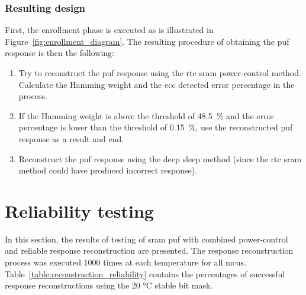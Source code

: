 \subsubsection*{Resulting design}

First, the enrollment phase is executed as is illustrated in Figure~\ref{fig:enrollment_diagram}. The resulting procedure of obtaining the \gls{puf} response is then the following:
\begin{enumerate}
    \item Try to reconstruct the \gls{puf} response using the \gls{rtc} \gls{sram} power-control method. Calculate the Hamming weight and the \gls{ecc} detected error percentage in the process.
    \item If the Hamming weight is above the threshold of 48.5~\% and the error percentage is lower than the threshold of 0.15~\%, use the reconstructed \gls{puf} response as a result and end.
    \item Reconstruct the \gls{puf} response using the deep sleep method (since the \gls{rtc} \gls{sram} method could have produced incorrect response).
\end{enumerate}

\section{Reliability testing}\label{sec:testing}

In this section, the results of testing of \gls{sram} \gls{puf} with combined power-control and reliable response reconstruction are presented. The response reconstruction process was executed 1000 times at each temperature for all \glspl{mcu}. Table~\ref{table:reconstruction_reliability} contains the percentages of successful response reconstructions using the 20 °C stable bit mask.

